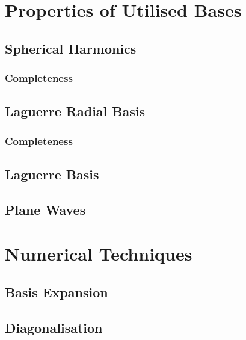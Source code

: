 \documentclass[draft]{article}
\begin{document}




\clearpage

\appendix

\section{Properties of Utilised Bases}
\label{app:properties}

\subsection{Spherical Harmonics}
\label{app:spherical-harmonics}

\subsubsection{Completeness}
\label{app:spherical-harmonic-completeness}

\subsection{Laguerre Radial Basis}
\label{app:laguerre-radial-basis}

\subsubsection{Completeness}
\label{app:laguerre-completeness}

\subsection{Laguerre Basis}
\label{app:laguerre-basis}

\subsection{Plane Waves}
\label{app:plane-waves}

\section{Numerical Techniques}
\label{app:numerical-techniques}

\subsection{Basis Expansion}
\label{app:basis-expansion}

\subsection{Diagonalisation}
\label{app:diagonalisation}
\end{document}
